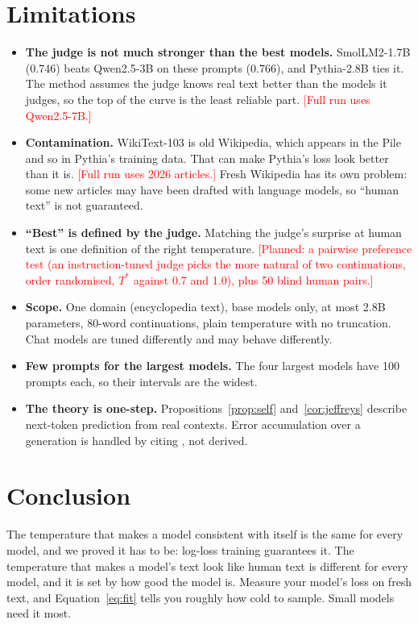 \documentclass[10pt]{article}
\newcommand{\todo}[1]{\textcolor{red}{[#1]}}
\newcommand{\Ts}{T^{*}}
\begin{document}
\section{Limitations}
\label{sec:limits}

\begin{itemize}
    \item \textbf{The judge is not much stronger than the best models.} SmolLM2-1.7B (0.746) beats Qwen2.5-3B on these prompts (0.766), and Pythia-2.8B ties it. The method assumes the judge knows real text better than the models it judges, so the top of the curve is the least reliable part. \todo{Full run uses Qwen2.5-7B.}
    \item \textbf{Contamination.} WikiText-103 is old Wikipedia, which appears in the Pile and so in Pythia's training data. That can make Pythia's loss look better than it is. \todo{Full run uses 2026 articles.} Fresh Wikipedia has its own problem: some new articles may have been drafted with language models, so ``human text'' is not guaranteed.
    \item \textbf{``Best'' is defined by the judge.} Matching the judge's surprise at human text is one definition of the right temperature. \todo{Planned: a pairwise preference test (an instruction-tuned judge picks the more natural of two continuations, order randomised, $\Ts$ against 0.7 and 1.0), plus 50 blind human pairs.}
    \item \textbf{Scope.} One domain (encyclopedia text), base models only, at most 2.8B parameters, 80-word continuations, plain temperature with no truncation. Chat models are tuned differently and may behave differently.
    \item \textbf{Few prompts for the largest models.} The four largest models have 100 prompts each, so their intervals are the widest.
    \item \textbf{The theory is one-step.} Propositions~\ref{prop:self} and~\ref{cor:jeffreys} describe next-token prediction from real contexts. Error accumulation over a generation is handled by citing \citet{cao2025entropy}, not derived.
\end{itemize}

\section{Conclusion}

The temperature that makes a model consistent with itself is the same for every model, and we proved it has to be: log-loss training guarantees it. The temperature that makes a model's text look like human text is different for every model, and it is set by how good the model is. Measure your model's loss on fresh text, and Equation~\ref{eq:fit} tells you roughly how cold to sample. Small models need it most.
\end{document}
